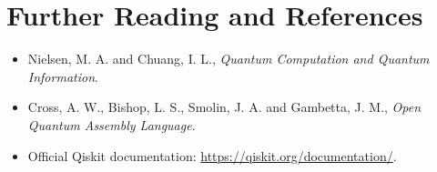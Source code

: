 \documentclass[12pt]{book}
\theoremstyle{remark}
\begin{document}
	\appendix
	\chapter{Further Reading and References}
	\begin{itemize}
		\item Nielsen, M. A. and Chuang, I. L., \emph{Quantum Computation and Quantum Information}.
		\item Cross, A. W., Bishop, L. S., Smolin, J. A. and Gambetta, J. M., \emph{Open Quantum Assembly Language}.
		\item Official Qiskit documentation: \url{https://qiskit.org/documentation/}.
	\end{itemize}
	
\end{document}
